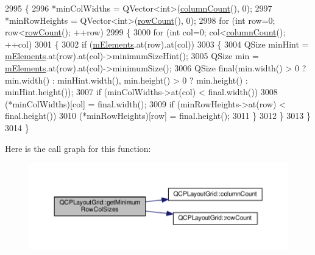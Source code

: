 \begin{DoxyCode}
2995 \{
2996   *minColWidths = QVector<int>(\hyperlink{class_q_c_p_layout_grid_ac39074eafd148b82d0762090f258189e}{columnCount}(), 0);
2997   *minRowHeights = QVector<int>(\hyperlink{class_q_c_p_layout_grid_af8e6c7a05864ebe610c87756c7b9079c}{rowCount}(), 0);
2998   \textcolor{keywordflow}{for} (\textcolor{keywordtype}{int} row=0; row<\hyperlink{class_q_c_p_layout_grid_af8e6c7a05864ebe610c87756c7b9079c}{rowCount}(); ++row)
2999   \{
3000     \textcolor{keywordflow}{for} (\textcolor{keywordtype}{int} col=0; col<\hyperlink{class_q_c_p_layout_grid_ac39074eafd148b82d0762090f258189e}{columnCount}(); ++col)
3001     \{
3002       \textcolor{keywordflow}{if} (\hyperlink{class_q_c_p_layout_grid_a3577d3855bf8ad20ef9079291a49f397}{mElements}.at(row).at(col))
3003       \{
3004         QSize minHint = \hyperlink{class_q_c_p_layout_grid_a3577d3855bf8ad20ef9079291a49f397}{mElements}.at(row).at(col)->minimumSizeHint();
3005         QSize min = \hyperlink{class_q_c_p_layout_grid_a3577d3855bf8ad20ef9079291a49f397}{mElements}.at(row).at(col)->minimumSize();
3006         QSize \textcolor{keyword}{final}(min.width() > 0 ? min.width() : minHint.width(), min.height() > 0 ? min.height() : 
      minHint.height());
3007         \textcolor{keywordflow}{if} (minColWidths->at(col) < \textcolor{keyword}{final}.width())
3008           (*minColWidths)[col] = \textcolor{keyword}{final}.width();
3009         \textcolor{keywordflow}{if} (minRowHeights->at(row) < \textcolor{keyword}{final}.height())
3010           (*minRowHeights)[row] = \textcolor{keyword}{final}.height();
3011       \}
3012     \}
3013   \}
3014 \}
\end{DoxyCode}


Here is the call graph for this function\+:\nopagebreak
\begin{figure}[H]
\begin{center}
\leavevmode
\includegraphics[width=350pt]{class_q_c_p_layout_grid_ac645fb9b1c4257b08a9f09dee10b9b3f_cgraph}
\end{center}
\end{figure}




